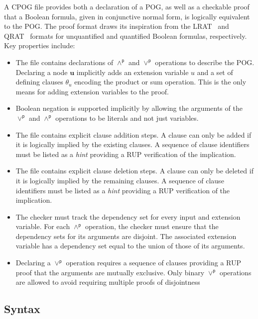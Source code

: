 \documentclass[twoside,11pt]{article}
\newcommand{\pand}{\mathbin{\land^\textsf{p}}}
\newcommand{\por}{\mathbin{\lor^\textsf{p}}}
\newcommand{\makenode}[1]{\mathbf{#1}}
\newcommand{\nodeu}{\makenode{u}}
\begin{document}
A CPOG file provides both a declaration of a POG, as well as a checkable
proof that a Boolean formula, given in conjunctive normal
form, is logically equivalent to the POG\@.
The proof format draws its inspiration from the LRAT~\cite{lrat} and
QRAT~\cite{heule:JAR2014} formats for unquantified and quantified Boolean formulas, respectively.
Key properties include:
\begin{itemize}
  \item
  The file contains declarations of $\pand$ and $\por$ operations to describe the POG.
  Declaring a node $\nodeu$ implicitly adds an extension variable $u$ and a set of defining clauses $\theta_{u}$
  encoding the product or sum operation.
  This is the only means for adding extension variables to the proof.
\item Boolean negation is supported implicitly by allowing the
  arguments of the $\por$ and $\pand$ operations to be literals and not just
  variables.
\item
  The file contains explicit clause addition steps.
  A clause can only be added if it is logically implied by the existing clauses.
  A sequence of clause identifiers must be listed as a \emph{hint} providing a RUP verification of the implication.
\item
  The file contains explicit clause deletion steps.
  A clause can only be deleted if it is logically implied by the remaining clauses.
  A sequence of clause identifiers must be listed as a \emph{hint} providing a RUP verification of the implication.
\item The checker must track the dependency set for every input and
  extension variable.  For each $\pand$ operation, the checker must ensure that the dependency sets for its arguments are disjoint.
  The associated extension variable has a dependency set equal to the union of those of its arguments.
\item Declaring a $\por$ operation requires a sequence of clauses
  providing a RUP proof that the arguments are mutually exclusive.
  Only binary $\por$ operations are allowed to avoid requiring multiple proofs of disjointness
\end{itemize}

\subsection{Syntax}
\label{subsection:syntax}
\end{document}
